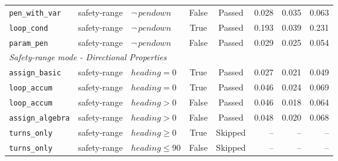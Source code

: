 {\begin{longtable}{p{} p{} p{} c c r r r}
\texttt{pen\_with\_var}  & safety-range & $\neg\,\mathit{pendown}$     & False & Passed & 0.028 & 0.035 & 0.063 \\
\texttt{loop\_cond}      & safety-range & $\neg\,\mathit{pendown}$     & True  & Passed & 0.193 & 0.039 & 0.231 \\
\texttt{param\_pen}      & safety-range & $\neg\,\mathit{pendown}$     & False & Passed & 0.029 & 0.025 & 0.054 \\
\midrule
\multicolumn{8}{l}{\textit{Safety-range mode - Directional Properties}} \\
\midrule
\texttt{assign\_basic}   & safety-range & $\mathit{heading}=0$         & True  & Passed  & 0.027 & 0.021 & 0.049 \\
\texttt{loop\_accum}     & safety-range & $\mathit{heading}=0$         & True  & Passed  & 0.046 & 0.024 & 0.069 \\
\texttt{loop\_accum}     & safety-range & $\mathit{heading}>0$         & False & Passed  & 0.046 & 0.018 & 0.064 \\
\texttt{assign\_algebra} & safety-range & $\mathit{heading}>0$         & False & Passed  & 0.048 & 0.020 & 0.068 \\
\texttt{turns\_only}     & safety-range & $\mathit{heading}\geq 0$        & True  & Skipped & --    & --    & --    \\
\texttt{turns\_only}     & safety-range & $\mathit{heading}\leq 90$       & False & Skipped & --    & --    & --    \\
\end{longtable}
}
